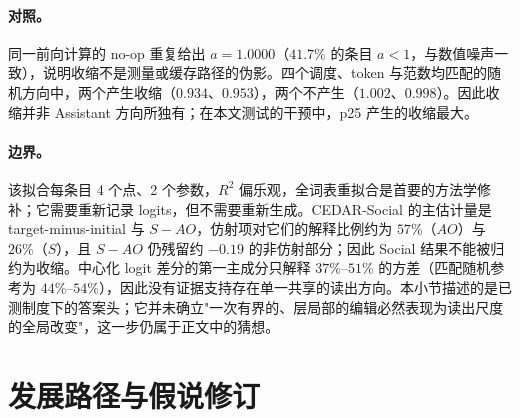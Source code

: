 \documentclass[UTF8,letterpaper,10pt,twocolumn]{ctexart}
\begin{document}
\paragraph{对照。}
同一前向计算的 no-op 重复给出 $a=1.0000$（$41.7\%$ 的条目 $a<1$，与数值噪声一致），说明收缩不是测量或缓存路径的伪影。四个调度、token 与范数均匹配的随机方向中，两个产生收缩（$0.934$、$0.953$），两个不产生（$1.002$、$0.998$）。因此收缩并非 Assistant 方向所独有；在本文测试的干预中，p25 产生的收缩最大。

\paragraph{边界。}
该拟合每条目 4 个点、2 个参数，$R^{2}$ 偏乐观，全词表重拟合是首要的方法学修补；它需要重新记录 logits，但不需要重新生成。CEDAR-Social 的主估计量是 target-minus-initial 与 $S-AO$，仿射项对它们的解释比例约为 $57\%$（$AO$）与 $26\%$（$S$），且 $S-AO$ 仍残留约 $-0.19$ 的非仿射部分；因此 Social 结果不能被归约为收缩。中心化 logit 差分的第一主成分只解释 $37\%$--$51\%$ 的方差（匹配随机参考为 $44\%$--$54\%$），因此没有证据支持存在单一共享的读出方向。本小节描述的是已测制度下的答案头；它并未确立"一次有界的、层局部的编辑必然表现为读出尺度的全局改变"，这一步仍属于正文中的猜想。

\section{发展路径与假说修订}
\label{supp:history-zh}
\end{document}
